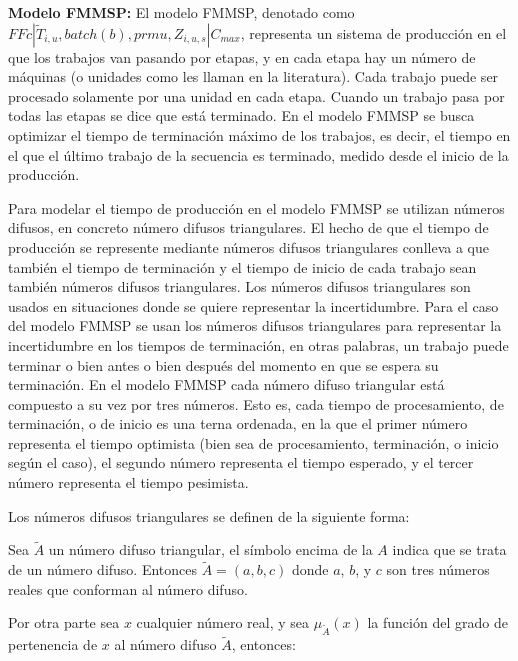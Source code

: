 \documentclass{article}
\def\notac_modelo{$FFc | \tilde{T}_{i, u}, batch(b), prmu, Z_{i, u, s} | C_{max}$}
\begin{document}
\vspace{\baselineskip}
\textbf{Modelo FMMSP:} El modelo FMMSP, denotado como \linebreak \notac_modelo, representa un sistema de producción en el que los trabajos van pasando por etapas, y en cada etapa hay un número de máquinas (o unidades como les llaman en la literatura). Cada trabajo puede ser procesado solamente por una unidad en cada etapa. Cuando un trabajo pasa por todas las etapas se dice que está terminado. En el modelo FMMSP se busca optimizar el tiempo de terminación máximo de los trabajos, es decir, el tiempo en el que el último trabajo de la secuencia es terminado, medido desde el inicio de la producción. \autocite{modFMMSP}

\vspace{\baselineskip}
Para modelar el tiempo de producción en el modelo FMMSP se utilizan números difusos, en concreto número difusos triangulares. El hecho de que el tiempo de producción se represente mediante números difusos triangulares conlleva a que también el tiempo de terminación y el tiempo de inicio de cada trabajo sean también números difusos triangulares. Los números difusos triangulares son usados en situaciones donde se quiere representar la incertidumbre. Para el caso del modelo FMMSP se usan los números difusos triangulares para representar la incertidumbre en los tiempos de terminación, en otras palabras, un trabajo puede terminar o bien antes o bien después del momento en que se espera su terminación. En el modelo FMMSP cada número difuso triangular está compuesto a su vez por tres números. Esto es, cada tiempo de procesamiento, de terminación, o de inicio es una terna ordenada, en la que el primer número representa el tiempo optimista (bien sea de procesamiento, terminación, o inicio según el caso), el segundo número representa el tiempo esperado, y el tercer número representa el tiempo pesimista. \autocite{modFMMSP}

\vspace{\baselineskip}
Los números difusos triangulares se definen de la siguiente forma: \autocite{fuzzyNum}

\vspace{\baselineskip}
Sea $\tilde{A}$ un número difuso triangular, el símbolo encima de la $A$ indica que se trata de un número difuso. Entonces $\tilde{A} = (a,b,c)$ donde $a$, $b$, y $c$ son tres números reales que conforman al número difuso.

\vspace{\baselineskip}
Por otra parte sea $x$ cualquier número real, y sea $\mu_{\tilde{A}}(x)$ la función del grado de pertenencia de $x$ al número difuso $\tilde{A}$, entonces:
\end{document}
